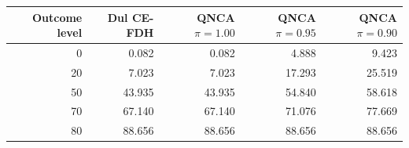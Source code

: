 \begin{tabular}{rrrrr}
\toprule
Outcome level & Dul CE-FDH & QNCA \(\pi=1.00\) & QNCA \(\pi=0.95\) & QNCA \(\pi=0.90\) \\
\midrule
0 & 0.082 & 0.082 & 4.888 & 9.423 \\
20 & 7.023 & 7.023 & 17.293 & 25.519 \\
50 & 43.935 & 43.935 & 54.840 & 58.618 \\
70 & 67.140 & 67.140 & 71.076 & 77.669 \\
80 & 88.656 & 88.656 & 88.656 & 88.656 \\
\bottomrule
\end{tabular}
